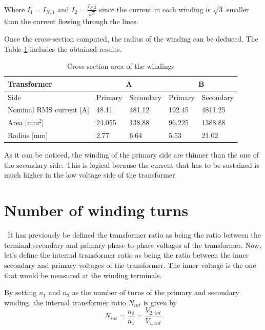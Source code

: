 \documentclass[12pt,a4paper]{report}
\begin{document}
Where $I_{1}=I_{N,1}$ and $I_{2}=\frac{I_{N,2}}{\sqrt{3}}$ since the current in each winding is $\sqrt{3}$ smaller than the current flowing through the lines.

Once the cross-section computed, the radius of the winding can be deduced. The Table \ref{tab:windings_A} includes the obtained results.
\begin{table}[h]
\centering
\begin{tabular}{l|llll}
Transformer             & \multicolumn{2}{c}{\textbf{A}} & \multicolumn{2}{c}{\textbf{B}} \\ \hline
Side                    & Primary       & Secondary       & Primary       & Secondary      \\
Nominal RMS current [A] & 48.11         & 481.12          & 192.45        & 4811.25        \\
Area [mm$^2$]           & 24.055        & 138.88          & 96.225        & 1388.88        \\
Radius [mm]             & 2.77          & 6.64            & 5.53          & 21.02         
\end{tabular}
\caption{Cross-section area of the windings}
\label{tab:windings_A}
\end{table}

As it can be noticed, the winding of the primary side are thinner than the one of the secondary side. This is logical because the current that has to be sustained is much higher in the low voltage side of the transformer.

\section{Number of winding turns}
\quad\, It has previously be defined the transformer ratio as being the ratio between the terminal secondary and primary phase-to-phase voltages of the transformer. Now, let's define the internal transformer ratio as being the ratio between the inner secondary and primary voltages of the transformer. The inner voltage is the one that would be measured at the winding terminals. 

By setting $n_1$ and $n_2$ as the number of turns of the primary and secondary winding, the internal transformer ratio $N_{int}$ is given by
\begin{equation}
    N_{int} = \frac{n_2}{n_1}=\frac{V_{2,int}}{V_{1,int}}
\end{equation}
\end{document}
